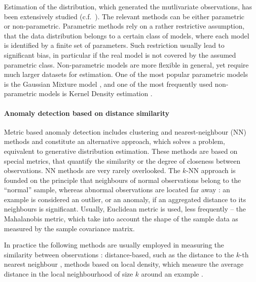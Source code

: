 \documentclass[a4paper,14pt]{extarticle}
\begin{document}
Estimation of the distribution, which generated the mutlivariate observations, has
been extensively studied (c.f.~\cite{chow1970,scott2008}). The relevant methods can
be either parametric or non-parametric. Parametric methods rely on a rather restrictive
assumption, that the data distribution belongs to a certain class of models, where
each model is identified by a finite set of parameters. Such restriction usually
lead to significant bias, in particular if the real model is not covered by the assumed
parametric class. Non-parametric models are more flexible in general, yet require
much larger datasets for estimation. One of the most popular parametric models is
the Gaussian Mixture model \cite{markou2003,chandola2009,miljkovic2010}, and one
of the most frequently used non-parametric models is Kernel Density estimation
\cite{duda2012,markou2003,chandola2009}.


\paragraph{Anomaly detection based on distance similarity} %
\label{par:anomaly_detection_based_on_distance_similarity}

Metric based anomaly detection includes clustering and nearest-neighbour (NN) methods
and constitute an alternative approach, which solves a problem, equivalent to generative
distribution estimation. These methods are based on special metrics, that quantify
the similarity or the degree of closeness between observations. NN methods are very
rarely overlooked. The $k$-NN approach is founded on the principle that neighbours
of normal observations belong to the ``normal'' sample, whereas abnormal observations
are located far away \cite{hautamaki2004}: an example is considered an outlier, or
an anomaly, if an aggregated distance to its neighbours is significant. Usually,
Euclidean metric is used, less frequently -- the Mahalanobis metric, which take
into account the shape of the sample data as measured by the sample covariance matrix.

In practice the following methods are usually employed in measuring the similarity
between observations \cite{duda2012}: distance-based, such as the distance to the
$k$-th nearest neighbour \cite{zhang2006}, methods based on local density, which
measure the average distance in the local neighbourhood of size $k$ around an example
\cite{hautamaki2004}.
\end{document}
